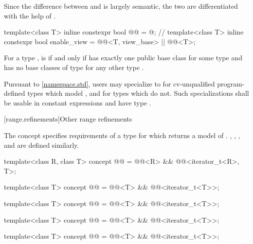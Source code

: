 \pnum
Since the difference between  and  is largely
semantic, the two are differentiated with the help of .

%
\begin{itemdecl}
template<class T>
  inline constexpr bool @@ = @\seebelownc@;     // \expos
template<class T>
  inline constexpr bool enable_view =
    @@<T, view_base> || @@<T>;
\end{itemdecl}

\begin{itemdescr}
\pnum
For a type ,
 is 
if and only if
 has exactly one public base class 
for some type  and
 has no base classes of type 
for any other type .

\pnum
\remarks
Pursuant to \ref{namespace.std}, users may specialize 
to 
for cv-unqualified program-defined types which model ,
and  for types which do not.
Such specializations shall
be usable in constant expressions and
have type .
\end{itemdescr}

[range.refinements]{Other range refinements}

\pnum
The  concept specifies requirements of a
 type for which  returns
a model of .
, , ,
and  are defined similarly.

\begin{itemdecl}
template<class R, class T>
  concept @@ =
    @@<R> && @@<iterator_t<R>, T>;

template<class T>
  concept @@ =
    @@<T> && @@<iterator_t<T>>;

template<class T>
  concept @@ =
    @@<T> && @@<iterator_t<T>>;

template<class T>
  concept @@ =
    @@<T> && @@<iterator_t<T>>;

template<class T>
  concept @@ =
    @@<T> && @@<iterator_t<T>>;
\end{itemdecl}

